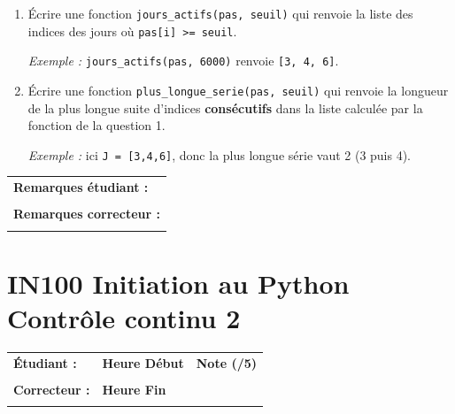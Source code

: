 \documentclass[a4paper,11pt]{article}
\begin{document}
\begin{enumerate}
\item \'Ecrire une fonction \texttt{jours\_actifs(pas, seuil)} qui renvoie la liste des indices des jours o\`u
\texttt{pas[i] >= seuil}.\\

\vspace{0.1 cm}

\textit{Exemple :} \texttt{jours\_actifs(pas, 6000)} renvoie \texttt{[3, 4, 6]}.

\item \'Ecrire une fonction \texttt{plus\_longue\_serie(pas, seuil)} qui renvoie la longueur de la plus longue suite d'indices
\textbf{cons\'ecutifs} dans la liste calculée par la fonction de la question 1. 

\vspace{0.1 cm}
\textit{Exemple :} ici \texttt{J = [3,4,6]}, donc la plus longue s\'erie vaut 2 (3 puis 4).
\end{enumerate}


\vspace{0.5 cm}
\begin{table}[h!]
\centering
\renewcommand{\arraystretch}{1.4} %
\begin{tabular}{|p{15cm}|}
\hline
\textbf{Remarques étudiant :}    \\
 \\
\hline
\textbf{Remarques correcteur :}  \\
 \\
\hline
\end{tabular}
\end{table}

\newpage


\section*{\center IN100 Initiation au Python\\
Contrôle continu 2}


\begin{table}[h!]
\centering
\renewcommand{\arraystretch}{1.4} %
\begin{tabular}{|p{10cm}|p{3cm}|p{2cm}|}
\hline
\textbf{Étudiant :} & \textbf{Heure Début }  & \textbf{Note (/5) }  \\
& & \\
\hline
\textbf{Correcteur :} & \textbf{Heure Fin } & \\
& & \\
\hline

\hline
\end{tabular}
\end{table}
\end{document}

